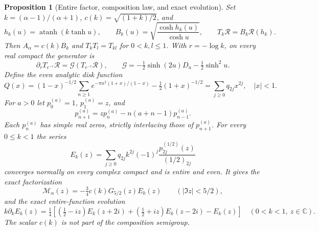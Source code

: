 \documentclass[11pt]{article}
\newtheorem{proposition}[theorem]{Proposition}
\theoremstyle{remark}\newtheorem{remark}[theorem]{Remark}
\newcommand{\C}{\mathbb C}
\begin{document}
\begin{proposition}[Entire factor, composition law, and exact evolution]
\label{prop:mehler-entire}
Set $k=(\alpha-1)/(\alpha+1)$, $c(k)=\sqrt{(1+k)/2}$, and
\[
 h_k(u)=\operatorname{atanh}(k\tanh u),\qquad
 B_k(u)=\sqrt{\frac{\cosh h_k(u)}{\cosh u}},\qquad
 T_k\mathcal R=B_k\mathcal R(h_k).
\]
Then $A_\alpha=c(k)B_k$ and $T_kT_l=T_{kl}$ for $0<k,l\le1$.
With $r=-\log k$, on every real compact the generator is
\[
 \partial_rT_{e^{-r}}\mathcal R=\mathcal G(T_{e^{-r}}\mathcal R),
 \qquad
 \mathcal G=-\tfrac12\sinh(2u)D_u-\tfrac12\sinh^2u.
\]
Define the even analytic disk function
\[
 Q(x)=(1-x)^{-1/2}\sum_{n\ge1}e^{-\pi n^2(1+x)/(1-x)}
                           -\tfrac12(1+x)^{-1/2}
       =\sum_{j\ge0}q_{2j}x^{2j},\quad |x|<1.
\]
For $a>0$ let $p_0^{(a)}=1$, $p_1^{(a)}=z$, and
\[
 p_{n+1}^{(a)}=zp_n^{(a)}-n(a+n-1)p_{n-1}^{(a)}.
\]
Each $p_n^{(a)}$ has simple real zeros, strictly interlacing those
of $p_{n+1}^{(a)}$. For every $0\le k<1$ the series
\[
 E_k(z)=\sum_{j\ge0}q_{2j}k^{2j}(-1)^j
                  \frac{p_{2j}^{(1/2)}(z)}{(1/2)_{2j}}
\]
converges normally on every complex compact and is entire and even.
It gives the exact factorization
\[
 \mathcal M_\alpha(z)=-\tfrac34c(k)G_{5/2}(z)E_k(z)
                      \qquad(|\Im z|<5/2), \tag{MFE}
\]
and the exact entire-function evolution
\[
 k\partial_kE_k(z)=\tfrac14\left[
 (\tfrac12-iz)E_k(z+2i)+(\tfrac12+iz)E_k(z-2i)-E_k(z)\right]
                   \quad(0<k<1,\ z\in\C). \tag{MD}
\]
The scalar $c(k)$ is not part of the composition semigroup.
\end{proposition}
\end{document}
